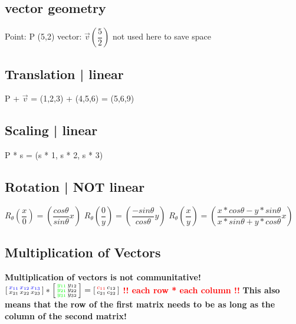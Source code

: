 \documentclass[main.tex,fontsize=12pt,paper=a4,paper=landscape,DIV=calc,]{scrartcl}
\begin{document}
\begin{multicols*}{4}

\section{vector geometry}
Point: P (5,2)\newline
vector: \(\vec{v} \left(\dfrac{5}{2}\right)\) \footnotesize not used here to save space
\normalsize

\subsection{Translation | linear}
P + \(\vec{v} \) = (1,2,3) + (4,5,6) = (5,6,9) 

\subsection{Scaling | linear}
P * s = (s * 1, s * 2, s * 3)

\subsection{Rotation | NOT linear}
\(R_\theta \left(\dfrac{x}{0}\right) = \left(\dfrac{cos \theta}{sin \theta} x\right)\)\newline
\(R_\theta \left(\dfrac{0}{y}\right) = \left(\dfrac{-sin \theta}{cos \theta} y\right)\)\newline
\(R_\theta \left(\dfrac{x}{y}\right) = \left(\dfrac{x * cos \theta - y * sin \theta}{x * sin \theta + y * cos \theta} x\right)\)

\subsection{Multiplication of Vectors}
\textbf{Multiplication of vectors is not communitative!}\newline
\(\left[\begin{smallmatrix}\textcolor{blue}{x_{11} \, x_{12} \, x_{13}} \\ x_{21} \, x_{22} \, x_{23} \end{smallmatrix}\right] *
\left[\begin{smallmatrix} \textcolor{green}{y_{11}} \, y_{12} \\ \textcolor{green}{y_{21}} \, y_{22} \\ 
\textcolor{green}{y_{31}} \, y_{32}\end{smallmatrix}\right] =
\left[\begin{smallmatrix} \textcolor{red}{c_{11}} \, c_{12} \\ c_{21} \, c_{22} \end{smallmatrix}\right]\)\newline
\textbf{\textcolor{red}{!! each row * each column !!}}\newline
\textbf{This also means that the row of the first matrix needs to be as long as the column of the second matrix!}\\


\end{multicols*}
\end{document}
